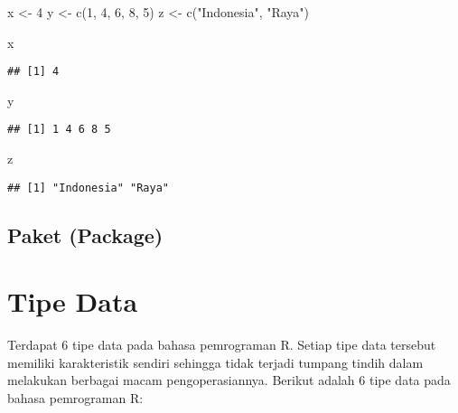\documentclass[
]{book}
\newenvironment{Shaded}{\begin{snugshade}}{\end{snugshade}}
\newcommand{\DecValTok}[1]{\textcolor[rgb]{0.00,0.00,0.81}{#1}}
\newcommand{\FunctionTok}[1]{\textcolor[rgb]{0.00,0.00,0.00}{#1}}
\newcommand{\NormalTok}[1]{#1}
\newcommand{\OtherTok}[1]{\textcolor[rgb]{0.56,0.35,0.01}{#1}}
\newcommand{\StringTok}[1]{\textcolor[rgb]{0.31,0.60,0.02}{#1}}
\begin{document}
\begin{Shaded}
\begin{Highlighting}[]
\NormalTok{x }\OtherTok{\textless{}{-}} \DecValTok{4}
\NormalTok{y }\OtherTok{\textless{}{-}} \FunctionTok{c}\NormalTok{(}\DecValTok{1}\NormalTok{, }\DecValTok{4}\NormalTok{, }\DecValTok{6}\NormalTok{, }\DecValTok{8}\NormalTok{, }\DecValTok{5}\NormalTok{)}
\NormalTok{z }\OtherTok{\textless{}{-}} \FunctionTok{c}\NormalTok{(}\StringTok{"Indonesia"}\NormalTok{, }\StringTok{"Raya"}\NormalTok{)}
\end{Highlighting}
\end{Shaded}

\begin{Shaded}
\begin{Highlighting}[]
\NormalTok{x}
\end{Highlighting}
\end{Shaded}

\begin{verbatim}
## [1] 4
\end{verbatim}

\begin{Shaded}
\begin{Highlighting}[]
\NormalTok{y}
\end{Highlighting}
\end{Shaded}

\begin{verbatim}
## [1] 1 4 6 8 5
\end{verbatim}

\begin{Shaded}
\begin{Highlighting}[]
\NormalTok{z}
\end{Highlighting}
\end{Shaded}

\begin{verbatim}
## [1] "Indonesia" "Raya"
\end{verbatim}

\hypertarget{paket-package}{%
\section{Paket (Package)}\label{paket-package}}

\hypertarget{datatype}{%
\chapter{Tipe Data}\label{datatype}}

Terdapat 6 tipe data pada bahasa pemrograman R. Setiap tipe data tersebut memiliki karakteristik sendiri sehingga tidak terjadi tumpang tindih dalam melakukan berbagai macam pengoperasiannya. Berikut adalah 6 tipe data pada bahasa pemrograman R:
\end{document}
